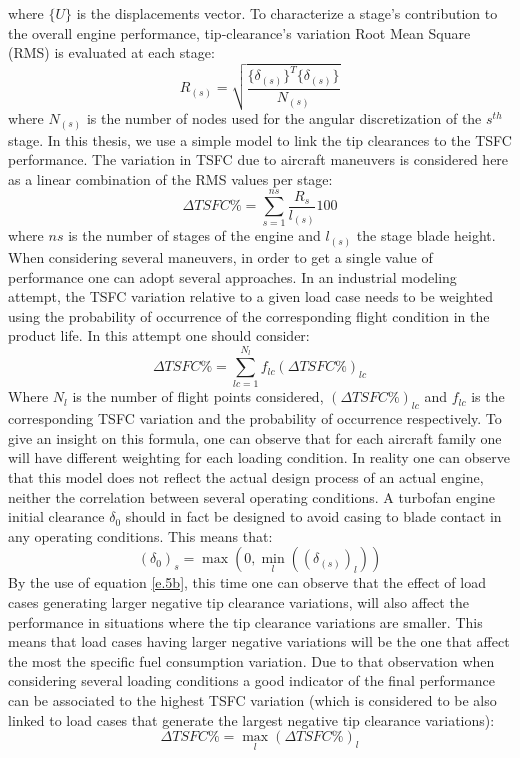 where $\lbrace U \rbrace$ is the displacements vector.
To characterize a stage's contribution to the overall engine performance, tip-clearance's variation Root Mean Square (RMS) is evaluated at each stage:
\begin{equation}
\label{e.4}
R_{(s)} =\sqrt{\frac{\lbrace\delta_{(s)}\rbrace^T\lbrace\delta_{(s)}\rbrace}{N_{(s)}}}
\end{equation}
where $N_{(s)}$ is the number of nodes used for the angular discretization of the $s^{th}$ stage. 
In this thesis, we use a simple model to link the tip clearances to the TSFC performance. The variation in TSFC due to aircraft maneuvers is considered here as a linear combination of the RMS values per stage:
\begin{equation}
\label{e.5}
\Delta TSFC \% = \sum_{s=1}^{ns}\frac{R_{s}}{l_{(s)}}100
\end{equation}
where $ns$ is the number of stages of the engine and $l_{(s)}$ the stage blade height.
When considering several maneuvers, in order to get a single value of performance one can adopt several approaches.
In an industrial modeling attempt, the TSFC variation relative to a given load case needs to be weighted using the probability of occurrence  of the corresponding flight condition in the product life. 
In this attempt one should consider:
\begin{equation}
\label{e.5b}
\Delta TSFC \% = \sum_{lc=1}^{N_l}f_{lc}(\Delta TSFC \%)_{lc}
\end{equation}
Where $N_l$ is the number of flight points considered, $(\Delta TSFC \%)_{lc}$ and $f_{lc}$ is the corresponding TSFC variation and the probability of occurrence respectively. To give an insight on this formula, one can observe that for each aircraft family one will have different weighting for each loading condition. In reality one can observe that this model does not reflect the actual design process of an actual engine, neither the correlation between several operating conditions. A turbofan engine initial clearance $\delta_0$ should in fact be designed to avoid casing to blade contact in any operating conditions. This means that:
\begin{equation}
(\delta_0)_s=\max{\left(0, \min_{l}{\left((\delta_{(s)})_l\right)}\right)}
\end{equation}
By the use of equation \ref{e.5b}, this time one can observe that the effect of load cases generating larger negative tip clearance variations, will also affect the performance in situations where the tip clearance variations are smaller. This means that load cases having larger negative variations will be the one that affect the most the specific fuel consumption variation. Due to that observation when considering several loading conditions a good indicator of the final performance can be associated to the highest TSFC variation (which is considered to be also linked to load cases that generate the largest negative tip clearance variations):
 \begin{equation}
 \label{e.5c}
 \Delta TSFC \% = \max_l(\Delta TSFC \%)_l
 \end{equation}
